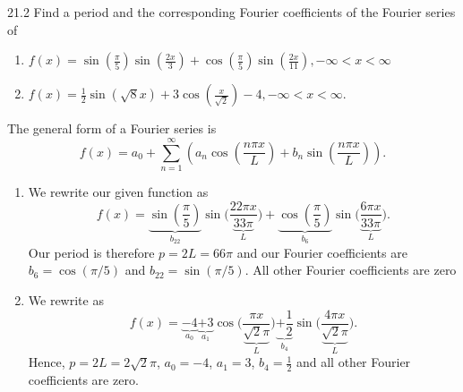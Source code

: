 
\begin{problem}{21.2}
  Find a period and the corresponding Fourier coefficients of the Fourier series of
  \begin{enumerate}[label=\alph*)]
    \item $f(x) = \sin \left( \frac{\pi}{5} \right) \sin \left( \frac{2x}{3} \right) + \cos \left( \frac{\pi}{5} \right) \sin \left( \frac{2x}{11} \right), -\infty<x<\infty$
    \item $f(x) = \frac{1}{2} \sin \left( \sqrt{8}x \right) + 3 \cos \left( \frac{x}{\sqrt{2}} \right) - 4, -\infty < x< \infty$.
  \end{enumerate}
\end{problem}

\begin{derivation}
  The general form of a Fourier series is
  \begin{equation*}
    f(x) = a_0 + \sum_{n = 1}^{\infty} \left( a_n \cos \left( \frac{n \pi x}{L} \right) + b_n \sin \left( \frac{n \pi x}{L} \right) \right)
  .\end{equation*}

  \begin{enumerate}[label=\alph*)]
    \item We rewrite our given function as
      \begin{equation*}
        f(x) = \underbrace{\sin \left( \frac{\pi}{5} \right)}_{b_{22}} \sin \bigg( \frac{22 \pi x}{\underbrace{33 \pi}_{L}} \bigg) + \underbrace{\cos \left( \frac{\pi}{5} \right)}_{b_{6}} \sin \bigg( \frac{6 \pi x}{\underbrace{33\pi}_L} \bigg)
      .\end{equation*}
      Our period is therefore $p = 2L = 66 \pi $ and our Fourier coefficients are $b_6 = \cos (\pi / 5)$ and $b_{22} = \sin (\pi / 5)$.
      All other Fourier coefficients are zero
    \item We rewrite as
      \begin{equation*}
        f(x) = \underbrace{-4}_{a_0} \underbrace{+3}_{a_1} \cos \bigg( \frac{\pi x}{\underbrace{\sqrt{2}\pi}_L} \bigg) \underbrace{+\frac{1}{2}}_{b_4} \sin \bigg( \frac{4\pi x}{\underbrace{\sqrt{2}\pi}_{L}} \bigg)
      .\end{equation*}
      Hence, $p = 2 L = 2 \sqrt{2}\pi$, $a_0 = -4$, $a_1 = 3$, $b_4 = \frac{1}{2}$ and all other Fourier coefficients are zero.
  \end{enumerate}
\end{derivation}

